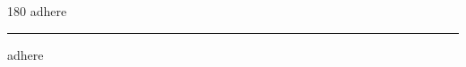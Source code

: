 
\begin{frame}
\begin{center}
\begin{turn}{180}
{\fontsize{2.5cm}{1em}\selectfont adhere}
\end{turn}
\vspace{1em}\par  
\hrule
\vspace{1em}\par  
{\fontsize{2.5cm}{1em}\selectfont adhere}
\end{center}
\end{frame}
